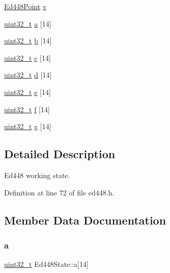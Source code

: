 \begin{DoxyCompactItemize}
\item 
\hyperlink{structEd448Point}{Ed448\+Point} \hyperlink{structEd448State_ae1caad09bcd6c049bdd8e32f11e181b0}{v}
\item 
\hyperlink{stdint_8h_a435d1572bf3f880d55459d9805097f62}{uint32\+\_\+t} \hyperlink{structEd448State_ad4cb72edff81f1f9a5b6bc63a1094c22}{a} \mbox{[}14\mbox{]}
\item 
\hyperlink{stdint_8h_a435d1572bf3f880d55459d9805097f62}{uint32\+\_\+t} \hyperlink{structEd448State_a5b53562eef4d3b0b81a24f016aa99bc4}{b} \mbox{[}14\mbox{]}
\item 
\hyperlink{stdint_8h_a435d1572bf3f880d55459d9805097f62}{uint32\+\_\+t} \hyperlink{structEd448State_a78d0f1209633c367017d8d461c4b6e84}{c} \mbox{[}14\mbox{]}
\item 
\hyperlink{stdint_8h_a435d1572bf3f880d55459d9805097f62}{uint32\+\_\+t} \hyperlink{structEd448State_a3f052b03dccc728fdff2d62927a9a59f}{d} \mbox{[}14\mbox{]}
\item 
\hyperlink{stdint_8h_a435d1572bf3f880d55459d9805097f62}{uint32\+\_\+t} \hyperlink{structEd448State_a62cda869b3e678db6b13553921f82f29}{e} \mbox{[}14\mbox{]}
\item 
\hyperlink{stdint_8h_a435d1572bf3f880d55459d9805097f62}{uint32\+\_\+t} \hyperlink{structEd448State_a6bc488bc58706d2eac01880e5df4c54b}{f} \mbox{[}14\mbox{]}
\item 
\hyperlink{stdint_8h_a435d1572bf3f880d55459d9805097f62}{uint32\+\_\+t} \hyperlink{structEd448State_adea8c65b2e29b9bbf50d317dfd064433}{g} \mbox{[}14\mbox{]}
\end{DoxyCompactItemize}


\subsection{Detailed Description}
Ed448 working state. 

Definition at line 72 of file ed448.\+h.



\subsection{Member Data Documentation}
\mbox{\label{structEd448State_ad4cb72edff81f1f9a5b6bc63a1094c22}} 
\subsubsection{\texorpdfstring{a}{a}}
{\footnotesize\ttfamily \hyperlink{stdint_8h_a435d1572bf3f880d55459d9805097f62}{uint32\+\_\+t} Ed448\+State\+::a\mbox{[}14\mbox{]}}



